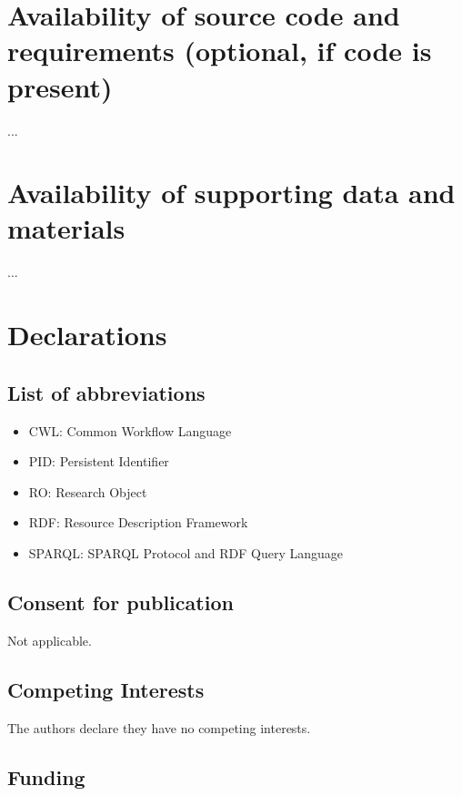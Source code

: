 % 






\section{Availability of source code and requirements (optional, if code is present)}

...

\section{Availability of supporting data and materials}

...

\section{Declarations}

\subsection{List of abbreviations}

\begin{itemize}
    \item CWL: Common Workflow Language
    \item PID: Persistent Identifier
    \item RO: Research Object
    \item RDF: Resource Description Framework
    \item SPARQL: SPARQL Protocol and RDF Query Language
\end{itemize}

\subsection{Consent for publication}

Not applicable.

\subsection{Competing Interests}

The authors declare they have no competing interests.

\subsection{Funding}

